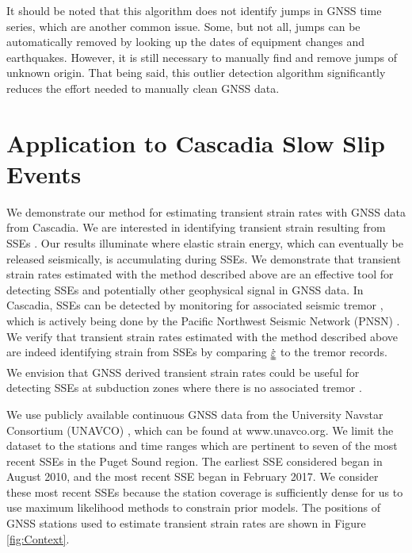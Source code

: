 \documentclass[10pt,letter]{article}
\newcommand*{\du}[1]{\uuline{#1}}
\begin{document}
It should be noted that this algorithm does not identify jumps in GNSS time series, which are another common issue. Some, but not all, jumps can be automatically removed by looking up the dates of equipment changes and earthquakes. However, it is still necessary to manually find and remove jumps of unknown origin. That being said, this outlier detection algorithm significantly reduces the effort needed to manually clean GNSS data.       

\section{Application to Cascadia Slow Slip Events}\label{sec:Cascadia}
We demonstrate our method for estimating transient strain rates with GNSS data from Cascadia. We are interested in identifying transient strain resulting from SSEs \citep[e.g.,][]{Dragert2001}. Our results illuminate where elastic strain energy, which can eventually be released seismically, is accumulating during SSEs. We demonstrate that transient strain rates estimated with the method described above are an effective tool for detecting SSEs and potentially other geophysical signal in GNSS data.  In Cascadia, SSEs can be detected by monitoring for associated seismic tremor \citep{Rogers2003}, which is actively being done by the Pacific Northwest Seismic Network (PNSN) \citep{Wech2010}. We verify that transient strain rates estimated with the method described above are indeed identifying strain from SSEs by comparing $\dot{\du{\varepsilon}}$ to the tremor records.  We envision that GNSS derived transient strain rates could be useful for detecting SSEs at subduction zones where there is no associated tremor \citep{Schwartz2007}.

We use publicly available continuous GNSS data from the University Navstar Consortium (UNAVCO) \citep{Herring2016}, which can be found at www.unavco.org. We limit the dataset to the stations and time ranges which are pertinent to seven of the most recent SSEs in the Puget Sound region. The earliest SSE considered began in August 2010, and the most recent SSE began in February 2017. We consider these most recent SSEs because the station coverage is sufficiently dense for us to use maximum likelihood methods to constrain prior models.  The positions of GNSS stations used to estimate transient strain rates are shown in Figure \ref{fig:Context}.  
\end{document}
